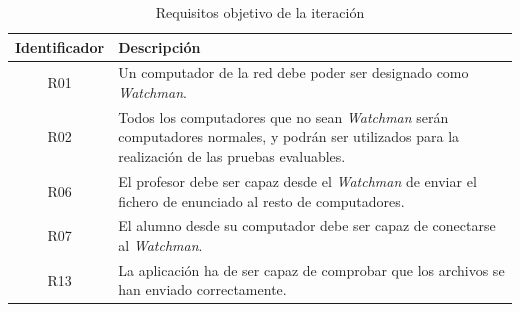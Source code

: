 \begin{table}
    \begin{tabular}{|c|p{12cm}|}
        \hline
        \textbf{Identificador} & \textbf{Descripción}
        \\ \hline

        R01 & Un computador de la red debe poder ser designado como \emph{Watchman}.
        \\ \hline

        R02 & Todos los computadores que no sean \emph{Watchman} serán computadores
        normales, y podrán ser utilizados para la realización de las pruebas evaluables.
        \\ \hline

        R06 & El profesor debe ser capaz desde el \emph{Watchman} de enviar el fichero de enunciado al resto de computadores.
        \\ \hline

        R07 & El alumno desde su computador debe ser capaz de conectarse al \emph{Watchman}.
        \\ \hline

        R13 & La aplicación ha de ser capaz de comprobar que los archivos se han enviado correctamente.
        \\ \hline

    \end{tabular}
    \caption{Requisitos objetivo de la iteración}
    \label{tabla:iteracion1:requisitosObjetivo}
\end{table}


